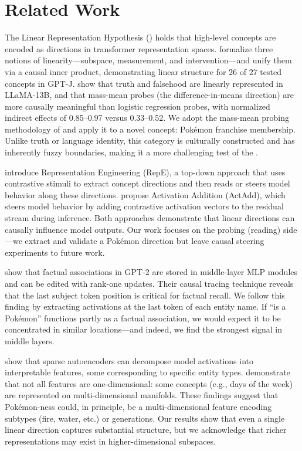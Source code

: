 \section{Related Work}
\label{sec:related}

The Linear Representation Hypothesis (\lrh) holds that high-level concepts are encoded as directions in transformer representation spaces. \citet{park2024linear} formalize three notions of linearity---subspace, measurement, and intervention---and unify them via a causal inner product, demonstrating linear structure for 26 of 27 tested concepts in GPT-J. \citet{marks2024geometry} show that truth and falsehood are linearly represented in LLaMA-13B, and that mass-mean probes (the difference-in-means direction) are more causally meaningful than logistic regression probes, with normalized indirect effects of 0.85--0.97 versus 0.33--0.52. We adopt the mass-mean probing methodology of \citet{marks2024geometry} and apply it to a novel concept: Pok\'{e}mon franchise membership. Unlike truth or language identity, this category is culturally constructed and has inherently fuzzy boundaries, making it a more challenging test of the \lrh.

\citet{zou2023representation} introduce Representation Engineering (RepE), a top-down approach that uses contrastive stimuli to extract concept directions and then reads or steers model behavior along these directions. \citet{turner2023activation} propose Activation Addition (ActAdd), which steers model behavior by adding contrastive activation vectors to the residual stream during inference. Both approaches demonstrate that linear directions can causally influence model outputs. Our work focuses on the probing (reading) side---we extract and validate a Pok\'{e}mon direction but leave causal steering experiments to future work.

\citet{meng2022locating} show that factual associations in GPT-2 are stored in middle-layer MLP modules and can be edited with rank-one updates. Their causal tracing technique reveals that the last subject token position is critical for factual recall. We follow this finding by extracting activations at the last token of each entity name. If ``is a Pok\'{e}mon'' functions partly as a factual association, we would expect it to be concentrated in similar locations---and indeed, we find the strongest signal in middle layers.

\citet{cunningham2023sparse} show that sparse autoencoders can decompose model activations into interpretable features, some corresponding to specific entity types. \citet{engels2024not} demonstrate that not all features are one-dimensional: some concepts (e.g., days of the week) are represented on multi-dimensional manifolds. These findings suggest that Pok\'{e}mon-ness could, in principle, be a multi-dimensional feature encoding subtypes (fire, water, etc.) or generations. Our results show that even a single linear direction captures substantial structure, but we acknowledge that richer representations may exist in higher-dimensional subspaces.
